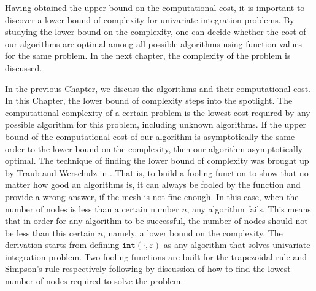 \documentclass{iitthesis}
\theoremstyle{definition}
\theoremstyle{remark}
\begin{document}
Having obtained the upper bound on the computational cost, it is important to discover a lower bound of complexity for univariate integration problems. By studying the lower bound on the complexity, one can decide whether the cost of our algorithms are optimal among all possible algorithms using function values for the same problem. In the next chapter, the complexity of the problem is discussed.


In the previous Chapter, we discuss the algorithms and their computational cost. In this Chapter, the lower bound of complexity steps into the spotlight. The computational complexity of a certain problem is the lowest cost required by any possible algorithm for this problem, including unknown algorithms. If the upper bound of the computational cost of our algorithm is asymptotically the same order to the lower bound on the complexity, then our algorithm asymptotically optimal. The technique of finding the lower bound of complexity was brought up by Traub and Werschulz in \cite[p.\ 11--12]{TraWer98}. That is, to build a fooling function to show that no matter how good an algorithms is, it can always be fooled by the function and provide a wrong answer, if the mesh is not fine enough. In this case, when the number of nodes is less than a certain number $n$, any algorithm fails. This means that in order for any algorithm to be successful, the number of nodes should not be less than this certain $n$, namely, a lower bound on the complexity. The derivation starts from defining $\texttt{int}(\cdot,\varepsilon)$ as any algorithm that solves univariate integration problem.  Two fooling functions are built for the trapezoidal rule and Simpson's rule respectively following by discussion of how to find the lowest number of nodes required to solve the problem.

\end{document}
